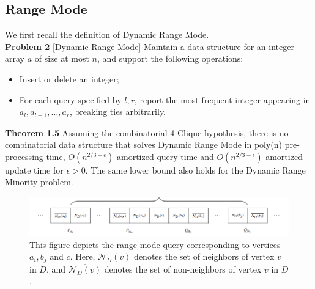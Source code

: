 \documentclass[preprint,10pt]{elsarticle}
\begin{document}
\begin{multicols}{2}
\subsection{Range Mode}
We first recall the definition of Dynamic Range Mode.\\
\textbf{Problem 2}\label{prob 2} [Dynamic Range Mode]
Maintain a data structure for an integer array $a$ of size at most $n$, and support the following operations:
\begin{itemize}
    \item Insert or delete an integer;
    \item For each query specified by $l, r$, report the most frequent integer appearing in $a_l, a_{l+1},\ldots, a_r$, breaking ties arbitrarily. 
\end{itemize}

\textbf{Theorem 1.5} Assuming the combinatorial 4-Clique hypothesis, there is no combinatorial data structure that solves Dynamic Range Mode in poly(n) pre-processing time, $O(n^{2/3-\epsilon})$ amortized query
time and $O(n^{2/3-\epsilon})$ amortized update time for $\epsilon>0$. The same lower
bound also holds for the Dynamic Range Minority problem.
\end{multicols}

\begin{figure}[h]
    \centering
    \includegraphics[width=1\linewidth]{Figure1.png}
    \caption{This figure depicts the range mode query corresponding to vertices $a_i, b_j$ and $c$. Here, $\mathcal{N}_D(v)$ denotes the set of neighbors of vertex $v$ in $D$, and $\overline{\mathcal{N}_D(v)}$ denotes the set of non-neighbors of vertex $v$ in $D$. }
    \label{fig:enter-label}
\end{figure}
\end{document}
